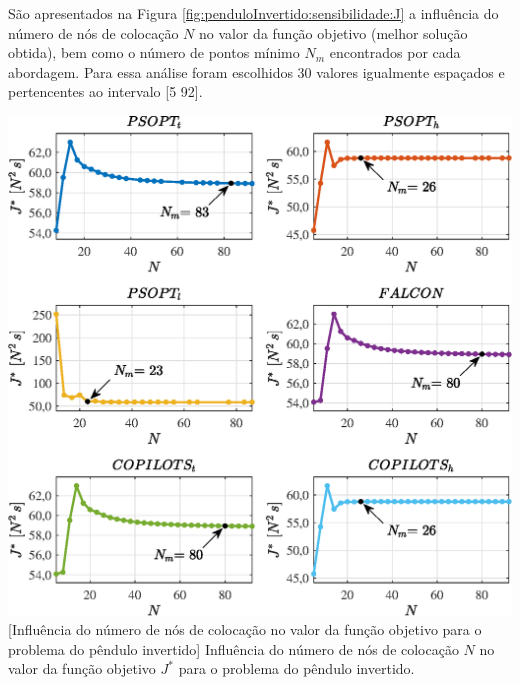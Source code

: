 
São apresentados na Figura \ref{fig:penduloInvertido:sensibilidade:J} a influência do número de nós de colocação $N$ no valor da função objetivo (melhor solução obtida), bem como o número de pontos mínimo $N_m$ encontrados por cada abordagem. Para essa análise foram escolhidos 30 valores igualmente espaçados e pertencentes ao intervalo [5 92].

\noindent	
\begin{minipage}{\textwidth}
	\vspace{\onelineskip}
	\centering
	\includegraphics[scale=0.7]{fig/resultados/penduloInvertido/sens/J}
	[Influência do número de nós de colocação no valor da função objetivo para o problema do pêndulo invertido]{
	Influência do número de nós de colocação $ N $ no valor da função objetivo $ J^* $ para o problema do pêndulo invertido.}
	\label{fig:penduloInvertido:sensibilidade:J}
	\vspace{\onelineskip}
\end{minipage}


